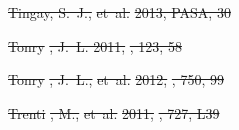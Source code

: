 \documentclass[numberedappendix]{emulateapj}
\providecommand{\DIFdel}[1]{{\protect\color{red}\sout{#1}}}                      %
\begin{document}
\DIFdel{Tingay, S.~J., }%
\DIFdel{et~al.}%
\DIFdel{2013, PASA, 30
}%

\DIFdel{Tonry}%
\DIFdel{, J.~L. 2011, }%
\DIFdel{, 123, 58
}%

\DIFdel{Tonry}%
\DIFdel{, J.~L., }%
\DIFdel{et~al.}%
\DIFdel{2012, }%
\DIFdel{, 750, 99
}%

\DIFdel{Trenti}%
\DIFdel{, M., }%
\DIFdel{et~al.}%
\DIFdel{2011, }%
\DIFdel{, 727, L39
}%
\end{document}
